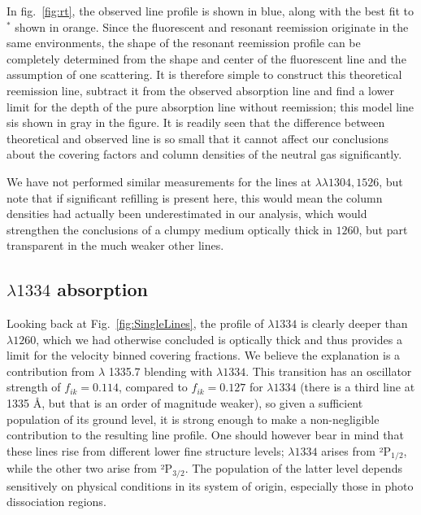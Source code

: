 \documentclass[twocolumn]{aastex61}
\begin{document}
In fig.~\ref{fig:rt}, the observed line profile is shown in blue, along
with the best fit to $^*$ shown in orange. Since the
fluorescent and resonant reemission originate in the same environments,
the shape of the resonant reemission profile can be completely
determined from the shape and center of the fluorescent line and the
assumption of one scattering. It is therefore simple to construct this
theoretical reemission line, subtract it from the observed absorption
line and find a lower limit for the depth of the pure absorption line
without reemission; this model line sis shown in gray in the figure. It
is readily seen that the difference between theoretical and observed
line is so small that it cannot affect our conclusions about the
covering factors and column densities of the neutral gas significantly.

We have not performed similar measurements for the lines at
$\lambda \lambda 1304, 1526$, but note that if significant refilling is
present here, this would mean the column densities had actually been
underestimated in our analysis, which would strengthen the conclusions
of a clumpy medium optically thick in  $1260$, but part
transparent in the much weaker other lines.

\subsection{ $\lambda 1334$
absorption}\label{lambda-1334-absorption}

Looking back at Fig.~\ref{fig:SingleLines}, the profile of 
$\lambda 1334$ is clearly deeper than  $\lambda 1260$, which
we had otherwise concluded is optically thick and thus provides a limit
for the velocity binned covering fractions. We believe the explanation
is a contribution from  $\lambda$ 1335.7 blending with
$\lambda 1334$. This transition has an oscillator strength of
$f_{ik} = 0.114$, compared to $f_{ik} = 0.127$ for $\lambda 1334$ (there
is a third line at 1335 Å, but that is an order of magnitude weaker), so
given a sufficient population of its ground level, it is strong enough
to make a non-negligible contribution to the resulting line profile. One
should however bear in mind that these lines rise from different lower
fine structure levels; $\lambda 1334$ arises from ²P$_{1/2}$, while the
other two arise from ²P$_{3/2}$. The population of the latter level
depends sensitively on physical conditions in its system of origin,
especially those in photo dissociation regions.
\end{document}

